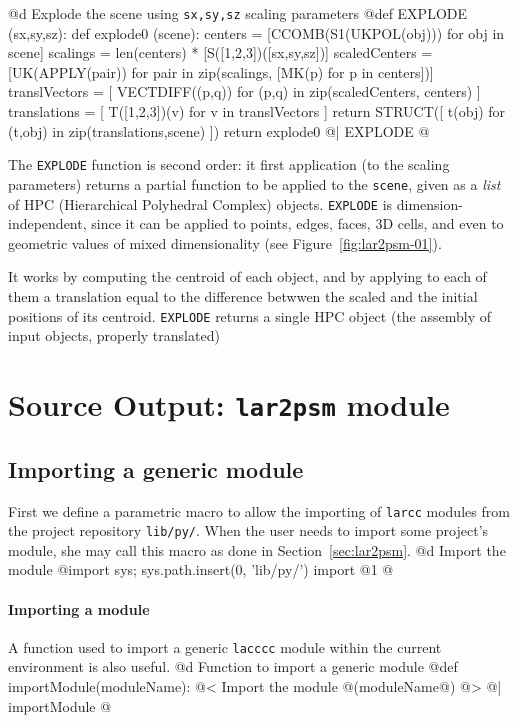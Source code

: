 \documentclass[11pt,oneside]{article}    %
\begin{document}
@d Explode the scene using \texttt{sx,sy,sz} scaling parameters
@{def EXPLODE (sx,sy,sz):
    def explode0 (scene):
        centers = [CCOMB(S1(UKPOL(obj))) for obj in scene]
        scalings = len(centers) * [S([1,2,3])([sx,sy,sz])]
        scaledCenters = [UK(APPLY(pair)) for pair in
                         zip(scalings, [MK(p) for p in centers])]
        translVectors = [ VECTDIFF((p,q)) for (p,q) in zip(scaledCenters, centers) ]
        translations = [ T([1,2,3])(v) for v in translVectors ]
        return STRUCT([ t(obj) for (t,obj) in zip(translations,scene) ])
    return explode0  
@| EXPLODE @}

The \texttt{EXPLODE} function is second order: it first application (to the scaling parameters) returns a partial function to be applied to the \texttt{scene}, given as a \emph{list} of HPC (Hierarchical Polyhedral Complex) objects. 
\texttt{EXPLODE} is dimension-independent, since it can be applied to points, edges, faces, 3D cells, and even to geometric values of mixed dimensionality (see Figure~\ref{fig:lar2psm-01}).

It works by computing the centroid of each object, and by applying to each of them a translation equal to the difference betwwen the scaled and the initial positions of its centroid. 
\texttt{EXPLODE}  returns a single HPC object (the assembly of input objects, properly translated)

\section{Source Output: \texttt{lar2psm} module}


\subsection{Importing a generic module}
First we define a parametric macro to allow the importing of \texttt{larcc} modules from the project repository \texttt{lib/py/}. When the user needs to import some project's module, she may call this macro as done in Section~\ref{sec:lar2psm}.
@d Import the module
@{import sys; sys.path.insert(0, 'lib/py/')
import @1
@}

\paragraph{Importing a module} A function used to import a generic \texttt{lacccc} module within the current environment is also useful.
@d Function to import a generic module
@{def importModule(moduleName):
    @< Import the module @(moduleName@) @>
@| importModule @}
\end{document}
